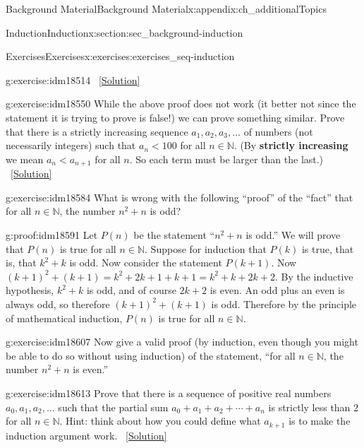 \documentclass[oneside,10pt,]{book}
\newcommand{\terminology}[1]{\textbf{#1}}
\numberwithin{equation}{chapter}
\def\N{\mathbb N}
\newcommand{\lt}{<}
\begin{document}
\begin{appendixptx}{Background Material}{}{Background Material}{}{}{x:appendix:ch_additionalTopics}
\begin{sectionptx}{Induction}{}{Induction}{}{}{x:section:sec_background-induction}
\begin{exercises-subsection}{Exercises}{}{Exercises}{}{}{x:exercises:exercises_seq-induction}
\begin{divisionexercise}{12}{}{}{g:exercise:idm18514}
\qquad~\hfill{\tiny\hyperlink{g:solution:idm18540-main}{[Solution]}}\end{divisionexercise}%
\begin{divisionexercise}{13}{}{}{g:exercise:idm18550}%
While the above proof does not work (it better not since the statement it is trying to prove is false!) we can prove something similar. Prove that there is a strictly increasing sequence \(a_1, a_2, a_3, \ldots\) of numbers (not necessarily integers) such that \(a_n \lt  100\) for all \(n \in \N\). (By \terminology{strictly increasing} we mean \(a_n \lt  a_{n+1}\) for all \(n\). So each term must be larger than the last.)%
\qquad~\hfill{\tiny\hyperlink{g:solution:idm18559-main}{[Solution]}}\end{divisionexercise}%
\begin{divisionexercise}{14}{}{}{g:exercise:idm18584}%
What is wrong with the following ``proof'' of the ``fact'' that for all \(n \in \N\), the number \(n^2 + n\) is odd?%
\begin{proofptx}{}{g:proof:idm18591}
Let \(P(n)\) be the statement ``\(n^2 + n\) is odd.'' We will prove that \(P(n)\) is true for all \(n \in \N\). Suppose for induction that \(P(k)\) is true, that is, that \(k^2 + k\) is odd. Now consider the statement \(P(k+1)\). Now \((k+1)^2 + (k+1) = k^2 + 2k + 1 + k + 1 = k^2 + k + 2k + 2\). By the inductive hypothesis, \(k^2 + k\) is odd, and of course \(2k + 2\) is even. An odd plus an even is always odd, so therefore \((k+1)^2 + (k+1)\) is odd. Therefore by the principle of mathematical induction, \(P(n)\) is true for all \(n \in \N\).%
\end{proofptx}
\end{divisionexercise}%
\begin{divisionexercise}{15}{}{}{g:exercise:idm18607}%
Now give a valid proof (by induction, even though you might be able to do so without using induction) of the statement, ``for all \(n \in \N\), the number \(n^2 + n\) is even.''%
\end{divisionexercise}%
\begin{divisionexercise}{16}{}{}{g:exercise:idm18613}%
Prove that there is a sequence of positive real numbers \(a_0, a_1, a_2, \ldots\) such that the partial sum \(a_0 + a_1 + a_2 + \cdots + a_n\) is strictly less than \(2\) for all \(n \in \N\). Hint: think about how you could define what \(a_{k+1}\) is to make the induction argument work.%
\qquad~\hfill{\tiny\hyperlink{g:solution:idm18621-main}{[Solution]}}\end{divisionexercise}%

\end{exercises-subsection}
\end{sectionptx}
\end{appendixptx}
\end{document}
